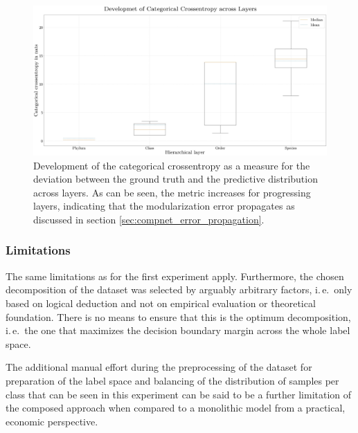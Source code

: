 \begin{figure}[tb]
    \centering
	    \includegraphics[width=\textwidth, trim=0 -25 0 -25, clip]{thesis/graphics/diagrams/ilsvrc2012/ilsvrc2012_compnet_modelling_error_cat_crossentropy_print.jpg}
    \caption{Development of the categorical crossentropy as a measure for the deviation between the ground truth and the predictive distribution across layers. As can be seen, the metric increases for progressing layers, indicating that the modularization error propagates as discussed in section \ref{sec:compnet_error_propagation}.}
    \label{fig:experiments_imagenet_results_modelling_error_cat_crossentropy}
\end{figure}
               
\subsubsection{Limitations%
               \label{sec:experiments_imagenet_limitations}}

The same limitations as for the first experiment apply. Furthermore, the chosen decomposition of the dataset was selected by arguably arbitrary factors, i.\,e.\ only based on logical deduction and not on empirical evaluation or theoretical foundation. There is no means to ensure that this is the optimum decomposition, i.\,e.\ the one that maximizes the decision boundary margin across the whole label space.

The additional manual effort during the preprocessing of the dataset for preparation of the label space and balancing of the distribution of samples per class that can be seen in this experiment can be said to be a further limitation of the composed approach when compared to a monolithic model from a practical, economic perspective.

